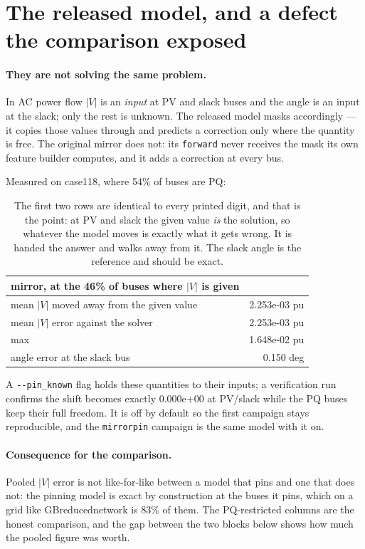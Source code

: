 \documentclass[10pt]{article}
\begin{document}
\section{The released model, and a defect the comparison exposed}
\label{sec:graphkit}

\paragraph{They are not solving the same problem.} In AC power flow $|V|$ is an
\emph{input} at PV and slack buses and the angle is an input at the slack; only
the rest is unknown. The released model masks accordingly --- it copies those
values through and predicts a correction only where the quantity is free. The
original mirror does not: its \texttt{forward} never receives the mask its own
feature builder computes, and it adds a correction at every bus.

Measured on case118, where 54\% of buses are PQ:

\begin{table}[H]
\centering
\small
\begin{tabular}{lr}
\toprule
mirror, at the 46\% of buses where $|V|$ is given & \\
\midrule
mean $|V|$ moved away from the given value & 2.253e-03 pu \\
mean $|V|$ error against the solver        & 2.253e-03 pu \\
max                                        & 1.648e-02 pu \\
angle error at the slack bus               & 0.150 deg \\
\bottomrule
\end{tabular}
\caption{The first two rows are identical to every printed digit, and that is
the point: at PV and slack the given value \emph{is} the solution, so whatever
the model moves is exactly what it gets wrong. It is handed the answer and walks
away from it. The slack angle is the reference and should be exact.}
\end{table}

A \texttt{-{}-pin\_known} flag holds these quantities to their inputs; a
verification run confirms the shift becomes exactly 0.000e+00 at PV/slack while
the PQ buses keep their full freedom. It is off by default so the first campaign
stays reproducible, and the \texttt{mirrorpin} campaign is the same model with
it on.

\paragraph{Consequence for the comparison.} Pooled $|V|$ error is not
like-for-like between a model that pins and one that does not: the pinning model
is exact by construction at the buses it pins, which on a grid like
GBreducednetwork is 83\% of them. The PQ-restricted columns are the honest
comparison, and the gap between the two blocks below shows how much the pooled
figure was worth.
\end{document}
